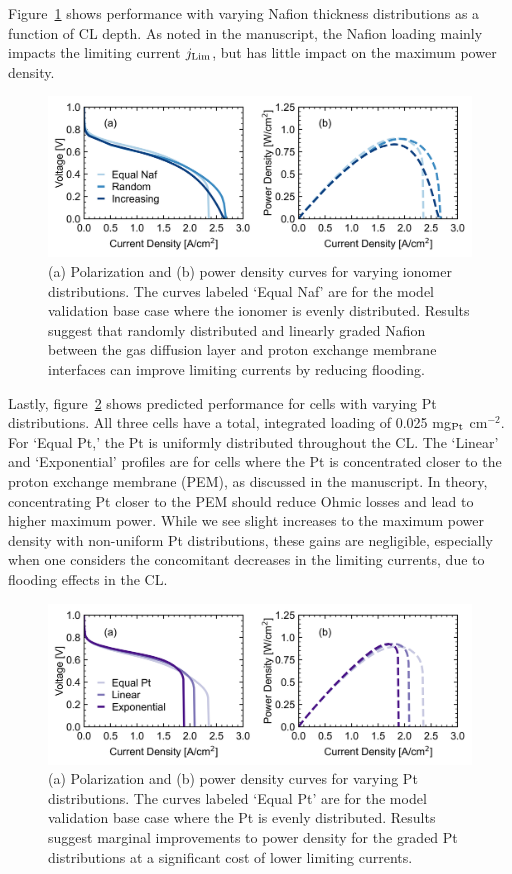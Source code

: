 \documentclass[final,3p,times,onecolumn]{elsarticle}    %
\begin{document}
\newpage
Figure~\ref{fig:naf-distribution-study} shows performance with varying Nafion thickness distributions as a function of CL depth. As noted in the manuscript, the Nafion loading mainly impacts the limiting current $j_{\rm Lim}$, but has little impact on the maximum power density.
\begin{figure}[H]
    \centering
    \includegraphics[width=5.718in]{figures/naf-distribution-5_718in.png}
    \caption{(a) Polarization and (b) power density curves for varying ionomer distributions. The curves labeled `Equal Naf' are for the model validation base case where the ionomer is evenly distributed. Results suggest that randomly distributed and linearly graded Nafion between the gas diffusion layer and proton exchange membrane interfaces can improve limiting currents by reducing flooding.}
    \label{fig:naf-distribution-study}
\end{figure}

Lastly, figure~\ref{fig:Pt-distribution-study} shows predicted performance for cells with varying Pt distributions.  All three cells have a total, integrated loading of 0.025 mg$_{\rm Pt}$ cm$^{-2}$.  For `Equal Pt,' the Pt is uniformly distributed throughout the CL.  The `Linear' and `Exponential' profiles are for cells where the Pt is concentrated closer to the proton exchange membrane (PEM), as discussed in the manuscript. In theory, concentrating Pt closer to the PEM should reduce Ohmic losses and lead to higher maximum power. While we see slight increases to the maximum power density with non-uniform Pt distributions, these gains are negligible, especially when one considers the concomitant decreases in the limiting currents, due to flooding effects in the CL.
\begin{figure}[H]
    \centering
    \includegraphics[width=5.718in]{figures/pt-distribution-5_718in.png}
    \caption{(a) Polarization and (b) power density curves for varying Pt distributions. The curves labeled `Equal Pt' are for the model validation base case where the Pt is evenly distributed. Results suggest marginal improvements to power density for the graded Pt distributions at a significant cost of lower limiting currents.}
    \label{fig:Pt-distribution-study}
\end{figure}
\end{document}

